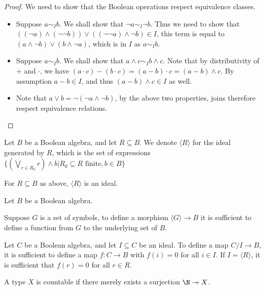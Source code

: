 \begin{proof}
  We need to show that the Boolean operations respect equivalence classes. 
  \begin{itemize}
    \item 
      Suppose $a \sim_I b$. We shall show that $\neg a \sim_I \neg b$. 
      Thus we need to show that 
      $((\neg a) \wedge (\neg \neg b)) \vee ((\neg \neg a) \wedge \neg b) \in I$, 
      this term is equal to 
      $( a \wedge \neg b) \vee (b \wedge \neg a)$, which is in $I$ as $ a\sim_I b$. 
    \item 
      Suppose $ a\sim _I b $. We shall show that 
      $a \wedge c \sim_I b \wedge c$. 
      Note that by distributivity of $+$ and $\cdot$, we have 
      $(a \cdot c) -( b \cdot c) = (a -b ) \cdot c = (a-b) \wedge c$. 
      By assumption $a -b \in I$, and thus $(a-b) \wedge c \in I$ as well. 
    \item Note that $a \vee b = \neg ( \neg a \wedge \neg b)$, by the above two properties, 
      joins therefore respect equivalence relations. 
  \end{itemize}
\end{proof}
\begin{definition}
  Let $B$ be a Boolean algebra, and let $R\subseteq B$. 
  We denote $\langle R\rangle $ for the ideal generated by $R$, 
  which is the set of expressions 
  $\{(\bigvee_{r \in R_0} r) \wedge b| R_0\subseteq R \text{ finite}, b \in B\}$
\end{definition} 
\begin{remark}
  For $R\subseteq B$ as above, $ \langle R \rangle$ is an ideal.
\end{remark}

\begin{remark}\label{rmkMorphismsOutOfQuotient}
  Let $B$ be a Boolean algebra. 
  
  Suppose $G$ is a set of symbols, to define a morphism 
  $\langle G \rangle \to B$ it is sufficient to define 
  a function from $G$ to the underlying set of $B$. 

  Let $C$ be a Boolean algebra, and let $I\subseteq C$ be an ideal. 
  To define a map $C / I \to B$, it is sufficient to define a map $f:C\to B$
  with $f(i) = 0$ for all $i\in I$. 
  If $I = \langle R\rangle $, it is sufficient that $f(r) = 0$ for all $r\in R$. 
\end{remark}
\begin{definition}
  A type $X$ is countable if there merely exists a surjection 
  $\N \twoheadrightarrow X$. 
\end{definition}

